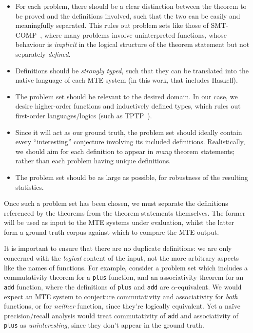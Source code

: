 \begin{itemize}
\item For each problem, there should be a clear distinction between the theorem
  to be proved and the definitions involved, such that the two can be easily and
  meaningfully separated. This rules out problem sets like those of
  SMT-COMP~\cite{barrett2005smt}, where many problems involve uninterpreted
  functions, whose behaviour is \emph{implicit} in the logical structure of the
  theorem statement but not separately \emph{defined}.
\item Definitions should be \emph{strongly typed}, such that they can be
  translated into the native language of each MTE system (in this work, that
  includes Haskell\iffalse FIXME and Isabelle\fi).
\item The problem set should be relevant to the desired domain. In our case, we
  desire higher-order functions and inductively defined types, which rules out
  first-order languages/logics (such as TPTP~\cite{sutcliffe2009tptp}).
\item Since it will act as our ground truth, the problem set should ideally
  contain every ``interesting'' conjecture involving its included
  definitions. Realistically, we should aim for each definition to appear in
  \emph{many} theorem statements; rather than each problem having unique
  definitions.
\item The problem set should be as large as possible, for robustness of the
  resulting statistics.
\end{itemize}

Once such a problem set has been chosen, we must separate the definitions
referenced by the theorems from the theorem statements themselves. The former
will be used as input to the MTE systems under evaluation, whilst the latter
form a ground truth corpus against which to compare the MTE output.

It is important to ensure that there are no duplicate definitions: we are only
concerned with the \emph{logical} content of the input, not the more arbitrary
aspects like the names of functions. For example, consider a problem set which
includes a commutativity theorem for a \texttt{plus} function, and an
associativity theorem for an \texttt{add} function, where the definitions of
\texttt{plus} and \texttt{add} are $\alpha$-equivalent. We would expect an MTE
system to conjecture commutativity and associativity for \emph{both} functions,
or for \emph{neither} function, since they're logically equivalent. Yet a
na\"ive precision/recall analysis would treat commutativity of \texttt{add} and
associativity of \texttt{plus} as \emph{uninteresting}, since they don't appear
in the ground truth.

